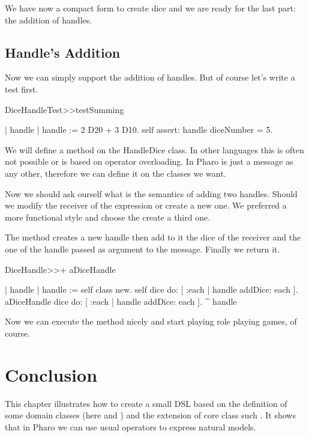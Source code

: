 \documentclass[a4paper,10pt,twoside]{book}
\begin{document}
We have now a compact form to create dice and we are ready for the last part: the addition of handles. 
\subsection{ Handle's Addition}
Now we can simply support the addition of handles. But of course let's write a test first.


\begin{code}{}
DiceHandleTest>>testSumming

	| handle |
	handle := 2 D20 + 3 D10.
	self assert: handle diceNumber = 5.
\end{code}


We will define a method \ct{+} on the HandleDice class. In other languages this is often not possible or is based on operator overloading. In Pharo \ct{+} is just a message as any other, therefore we can define it on the classes we want.

Now we should ask ourself what is the semantics of adding two handles. Should we modify the receiver of the expression or create a new one. We preferred a more functional style and choose the create a third one. 

The method \ct{+} creates a new handle then add to it the dice of the receiver and the one of the handle passed as argument to the message. Finally we return it. 


\begin{code}{}
DiceHandle>>+ aDiceHandle

	| handle |
	handle := self class new.
	self dice do: [ :each | handle addDice: each ].
	aDiceHandle dice do: [ :each | handle addDice: each ].
	^ handle
\end{code}


Now we can execute the method  nicely and start playing role playing games, of course.
\section{ Conclusion}
This chapter illustrates how to create a small DSL based on the definition of some domain classes (here  and  
 ) and the extension of core class such .
It shows that in Pharo we can use usual operators to express natural models.



\ifx\wholebook\relax\else
   
\end{document}
